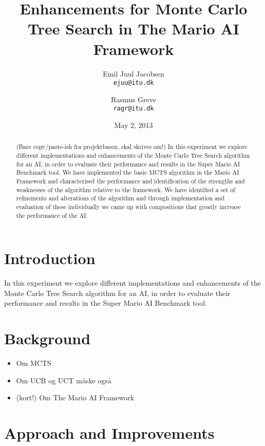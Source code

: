 \documentclass[10pt,a4paper,twoside]{article}
\begin{document}
\title{Enhancements for Monte Carlo Tree Search in The Mario AI Framework}
\date{May 2, 2013}
\author{Emil Juul Jacobsen\\\texttt{ejuu@itu.dk}        
        \and Rasmus Greve\\\texttt{ragr@itu.dk}}
\maketitle

\begin{abstract}
(Bare copy/paste-ish fra projektbasen, skal skrives om!)
In this experiment we explore different implementations and enhancements of the Monte Carlo Tree Search algorithm for an AI, in order to evaluate their performance and results in the Super Mario AI Benchmark tool. 
We have implemented the basic MCTS algorithm in the Mario AI 
Framework and characterised the performance and identification of 
the strengths and weaknesses of the algorithm relative to the 
framework. We have identified a set of refinements and alterations of the algorithm 
and through implementation and evaluation of these individually we came up
with compositions that greatly increase the performance of the AI.
\end{abstract}

\pagebreak

\section{Introduction}
In this experiment we explore different implementations and enhancements of the Monte Carlo Tree Search algorithm for an AI, in order to evaluate their performance and results in the Super Mario AI Benchmark tool. 

\section{Background}
\begin{itemize}
\item Om MCTS \cite{mctssurvey}
\item Om UCB og UCT \cite{mctssurvey} måske også \cite{mspacman}
\item (kort!) Om The Mario AI Framework  \cite{mario}
\end{itemize}



\section{Approach and Improvements}
\end{document}
